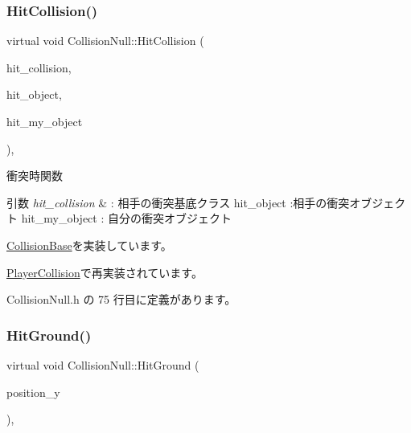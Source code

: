 \subsubsection{\texorpdfstring{Hit\+Collision()}{HitCollision()}}
{\footnotesize\ttfamily virtual void Collision\+Null\+::\+Hit\+Collision (\begin{DoxyParamCaption}\item[{\mbox{\hyperlink{class_collision_base}{Collision\+Base}} $\ast$}]{hit\+\_\+collision,  }\item[{\mbox{\hyperlink{class_collision_object}{Collision\+Object}} $\ast$}]{hit\+\_\+object,  }\item[{\mbox{\hyperlink{class_collision_object}{Collision\+Object}} $\ast$}]{hit\+\_\+my\+\_\+object }\end{DoxyParamCaption})\hspace{0.3cm}{\ttfamily [inline]}, {\ttfamily [virtual]}}



衝突時関数 


\begin{DoxyParams}{引数}
{\em hit\+\_\+collision} & \+: 相手の衝突基底クラス hit\+\_\+object \+:相手の衝突オブジェクト hit\+\_\+my\+\_\+object \+: 自分の衝突オブジェクト \\
\hline
\end{DoxyParams}


\mbox{\hyperlink{class_collision_base_a5c94fe03f875595758e83eb2a176e45d}{Collision\+Base}}を実装しています。



\mbox{\hyperlink{class_player_collision_ad937a5fd226e742270202bf4eff53767}{Player\+Collision}}で再実装されています。



 Collision\+Null.\+h の 75 行目に定義があります。

\mbox{\label{class_collision_null_a75900c2cec4e49336701e2e3c64e5bfe}} 
\subsubsection{\texorpdfstring{Hit\+Ground()}{HitGround()}}
{\footnotesize\ttfamily virtual void Collision\+Null\+::\+Hit\+Ground (\begin{DoxyParamCaption}\item[{float}]{position\+\_\+y }\end{DoxyParamCaption})\hspace{0.3cm}{\ttfamily [inline]}, {\ttfamily [virtual]}}



